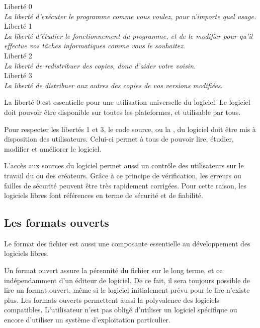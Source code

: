 \begin{center}
\begin{minipage}{0.8\textwidth}
\begin{center}
\textcolor{Cdl}{\large Liberté 0} \\ \textit{La liberté d'exécuter le programme comme vous voulez, pour n'importe quel usage.} \\
\textcolor{Cdl}{\large Liberté 1} \\ \textit{La liberté d'étudier le fonctionnement du programme, et de le modifier pour qu'il effectue vos tâches informatiques comme vous le souhaitez.} \\
\textcolor{Cdl}{\large Liberté 2} \\ \textit{La liberté de redistribuer des copies, donc d'aider votre voisin.} \\
\textcolor{Cdl}{\large Liberté 3} \\ \textit{La liberté de distribuer aux autres des copies de vos versions modifiées.}
\end{center}
\end{minipage}
\end{center}

La \textcolor{Cdl}{liberté 0} est essentielle pour une utilisation universelle du logiciel. Le logiciel doit pouvoir être disponible sur toutes les plateformes, et utilisable par tous.

\Separateur

Pour respecter les \textcolor{Cdl}{libertés 1 et 3}, le code source, ou la , du logiciel doit être mis à disposition des utilisateurs. Celui-ci permet à tous de pouvoir lire, étudier, modifier et améliorer le logiciel.

\Separateur

L’accès aux \textcolor{Cdl}{sources} du logiciel permet aussi un contrôle des utilisateurs sur le travail du ou des créateurs. Grâce à ce principe de vérification, les erreurs ou failles de sécurité peuvent être très rapidement corrigées. Pour cette raison, les logiciels libres font références en terme de sécurité et de fiabilité.

\subsection{Les formats ouverts}

Le format des fichier est aussi une composante essentielle au développement des logiciels libres.

Un \textcolor{Cdl}{format ouvert} assure la pérennité du fichier sur le long terme, et ce indépendamment d’un éditeur de logiciel. De ce fait, il sera toujours possible de lire un format ouvert, même si le logiciel initialement prévu pour le lire n’existe plus. Les formats ouverts permettent aussi la polyvalence des logiciels compatibles. L’utilisateur n’est pas obligé d’utiliser un logiciel spécifique ou encore d’utiliser un système d’exploitation particulier.

